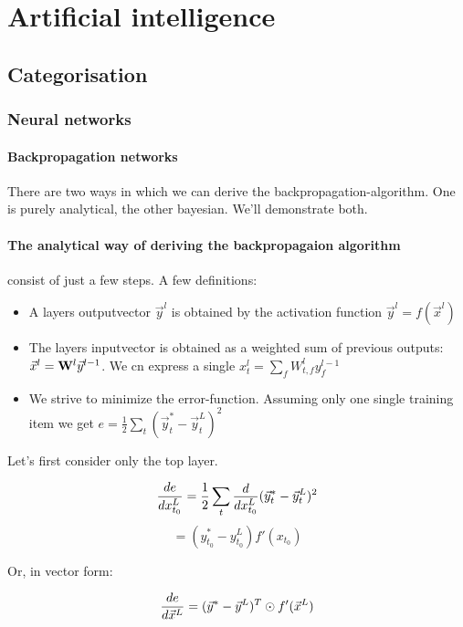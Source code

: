\section{Artificial intelligence}

\subsection{Categorisation}

\subsubsection{Neural networks}

\paragraph{Backpropagation networks}

There are two ways in which we can derive the backpropagation-algorithm. One is purely analytical, the other bayesian. We'll demonstrate both. 

\paragraph{The analytical way of deriving the backpropagaion algorithm} consist of just a few steps. 
A few definitions: 

\begin{itemize}
	\item A layers outputvector $\vec{y}^l$ is obtained by the activation function $\vec{y}^l = f(\vec{x}^l) $
	\item The layers inputvector is obtained as a weighted sum of previous outputs: $\vec{x}^l = \mathbf{W}^l \vec{y}^{l-1} $. We cn express a single $x_t^l = \sum_f W_{t,f}^l y_f^{l-1}$
	\item We strive to minimize the error-function. Assuming only one single training item we get $e = \frac{1}{2} \sum_t (\vec{y}^*_t - \vec{y}^L_t)^2 $
\end{itemize}

Let's first consider only the top layer. 

$$   \frac{ \mathop{de} }{ \mathop{dx_{t_0}^L} }  = \frac{1}{2} \sum_t  \frac{ \mathop{d} }{ \mathop{dx_{t_0}^L} }  (\vec{y}^*_t - \vec{y}^L_t)^2 $$
$$ = (y_{t_0}^* - y_{t_0}^L) f'(x_{t_0}) $$

Or, in vector form: 

$$  \frac{ \mathop{de} }{ \mathop{d\vec{x}^L} }  = (\vec{y}^* - \vec{y}^L)^T \odot f'(\vec{x}^L)  $$


